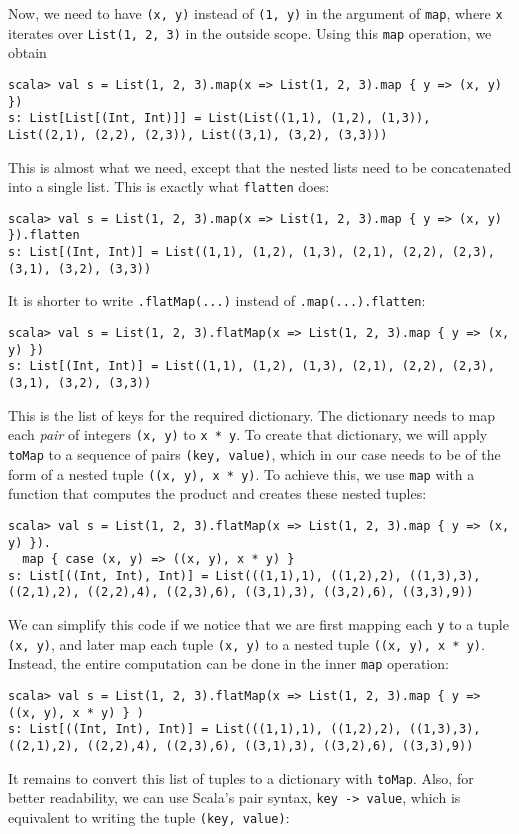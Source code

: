 Now, we need to have \lstinline!(x, y)! instead of \lstinline!(1, y)!
in the argument of \lstinline!map!, where \lstinline!x! iterates
over \lstinline!List(1, 2, 3)! in the outside scope. Using this \lstinline!map!
operation, we obtain
\begin{lstlisting}
scala> val s = List(1, 2, 3).map(x => List(1, 2, 3).map { y => (x, y) })
s: List[List[(Int, Int)]] = List(List((1,1), (1,2), (1,3)), List((2,1), (2,2), (2,3)), List((3,1), (3,2), (3,3)))
\end{lstlisting}
This is almost what we need, except that the nested lists need to
be concatenated into a single list. This is exactly what \lstinline!flatten!
does:
\begin{lstlisting}
scala> val s = List(1, 2, 3).map(x => List(1, 2, 3).map { y => (x, y) }).flatten
s: List[(Int, Int)] = List((1,1), (1,2), (1,3), (2,1), (2,2), (2,3), (3,1), (3,2), (3,3))
\end{lstlisting}
It is shorter to write \lstinline!.flatMap(...)! instead of \lstinline!.map(...).flatten!:
\begin{lstlisting}
scala> val s = List(1, 2, 3).flatMap(x => List(1, 2, 3).map { y => (x, y) })
s: List[(Int, Int)] = List((1,1), (1,2), (1,3), (2,1), (2,2), (2,3), (3,1), (3,2), (3,3)) 
\end{lstlisting}
This is the list of keys for the required dictionary. The dictionary
needs to map each \emph{pair} of integers \lstinline!(x, y)! to \lstinline!x * y!.
To create that dictionary, we will apply \lstinline!toMap! to a sequence
of pairs \lstinline!(key, value)!, which in our case needs to be
of the form of a nested tuple \lstinline!((x, y), x * y)!. To achieve
this, we use \lstinline!map! with a function that computes the product
and creates these nested tuples:
\begin{lstlisting}
scala> val s = List(1, 2, 3).flatMap(x => List(1, 2, 3).map { y => (x, y) }).
  map { case (x, y) => ((x, y), x * y) }
s: List[((Int, Int), Int)] = List(((1,1),1), ((1,2),2), ((1,3),3), ((2,1),2), ((2,2),4), ((2,3),6), ((3,1),3), ((3,2),6), ((3,3),9))
\end{lstlisting}
We can simplify this code if we notice that we are first mapping each
\lstinline!y! to a tuple \lstinline!(x, y)!, and later map each
tuple \lstinline!(x, y)! to a nested tuple \lstinline!((x, y), x * y)!.
Instead, the entire computation can be done in the inner \lstinline!map!
operation:
\begin{lstlisting}
scala> val s = List(1, 2, 3).flatMap(x => List(1, 2, 3).map { y => ((x, y), x * y) } )
s: List[((Int, Int), Int)] = List(((1,1),1), ((1,2),2), ((1,3),3), ((2,1),2), ((2,2),4), ((2,3),6), ((3,1),3), ((3,2),6), ((3,3),9))
\end{lstlisting}
It remains to convert this list of tuples to a dictionary with \lstinline!toMap!.
Also, for better readability, we can use Scala\textsf{'}s pair syntax, \lstinline!key -> value!,
which is equivalent to writing the tuple \lstinline!(key, value)!:

